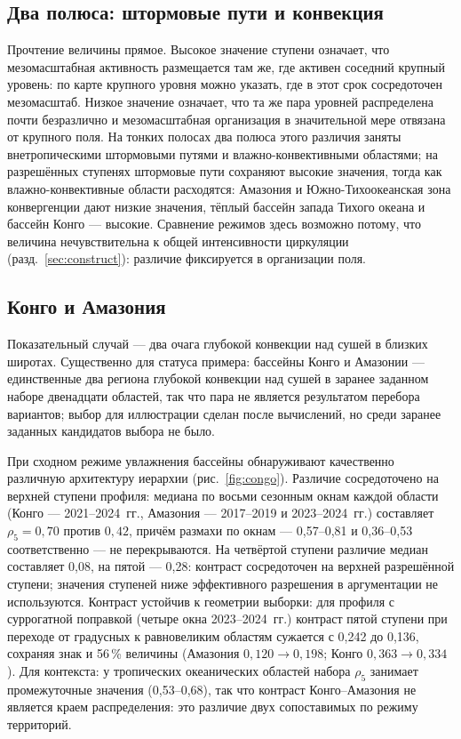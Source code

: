 \documentclass[11pt,a4paper]{article}
\begin{document}
\subsection{Два полюса: штормовые пути и конвекция}

Прочтение величины прямое. Высокое значение ступени означает, что мезомасштабная активность размещается там же, где активен соседний крупный уровень: по карте крупного уровня можно указать, где в этот срок сосредоточен мезомасштаб. Низкое значение означает, что та же пара уровней распределена почти безразлично и мезомасштабная организация в значительной мере отвязана от крупного поля. На тонких полосах два полюса этого различия заняты внетропическими штормовыми путями и влажно-конвективными областями; на разрешённых ступенях штормовые пути сохраняют высокие значения, тогда как влажно-конвективные области расходятся: Амазония и Южно-Тихоокеанская зона конвергенции дают низкие значения, тёплый бассейн запада Тихого океана и бассейн Конго --- высокие. Сравнение режимов здесь возможно потому, что величина нечувствительна к общей интенсивности циркуляции (разд.~\ref{sec:construct}): различие фиксируется в организации поля.

\subsection{Конго и Амазония}

Показательный случай --- два очага глубокой конвекции над сушей в близких широтах. Существенно для статуса примера: бассейны Конго и Амазонии --- единственные два региона глубокой конвекции над сушей в заранее заданном наборе двенадцати областей, так что пара не является результатом перебора вариантов; выбор для иллюстрации сделан после вычислений, но среди заранее заданных кандидатов выбора не было.

При сходном режиме увлажнения бассейны обнаруживают качественно различную архитектуру иерархии (рис.~\ref{fig:congo}). Различие сосредоточено на верхней ступени профиля: медиана по восьми сезонным окнам каждой области (Конго --- 2021--2024~гг., Амазония --- 2017--2019 и 2023--2024~гг.) составляет $\rho_5=0{,}70$ против $0{,}42$, причём размахи по окнам --- 0,57--0,81 и 0,36--0,53 соответственно --- не перекрываются. На четвёртой ступени различие медиан составляет 0,08, на пятой --- 0,28: контраст сосредоточен на верхней разрешённой ступени; значения ступеней ниже эффективного разрешения в аргументации не используются. Контраст устойчив к геометрии выборки: для профиля с суррогатной поправкой (четыре окна 2023--2024~гг.) контраст пятой ступени при переходе от градусных к равновеликим областям сужается с 0,242 до 0,136, сохраняя знак и 56\,\% величины (Амазония $0{,}120\to0{,}198$; Конго $0{,}363\to0{,}334$). Для контекста: у тропических океанических областей набора $\rho_5$ занимает промежуточные значения (0,53--0,68), так что контраст Конго--Амазония не является краем распределения: это различие двух сопоставимых по режиму территорий.
\end{document}
